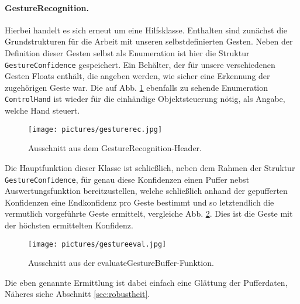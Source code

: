 	\paragraph{GestureRecognition.} Hierbei handelt es sich erneut um eine Hilfsklasse. Enthalten sind zunächst die Grundstrukturen für die Arbeit mit unseren selbstdefinierten Gesten. Neben der Definition dieser Gesten selbst als Enumeration ist hier die Struktur \glqq \texttt{GestureConfidence}\grqq{} gespeichert. Ein Behälter, der für unsere verschiedenen Gesten Floats enthält, die angeben werden, wie sicher eine Erkennung der zugehörigen Geste war. Die auf Abb. \ref{fig:gestrechead} ebenfalls zu sehende Enumeration \texttt{ControlHand} ist wieder für die einhändige Objektsteuerung nötig, als Angabe, welche Hand steuert.\par
	\begin{figure}[h]
	\centering
	\texttt{[image: pictures/gesturerec.jpg]}
	\caption{Ausschnitt aus dem GestureRecognition-Header.}\label{fig:gestrechead}
	\end{figure}	
	Die Hauptfunktion dieser Klasse ist schließlich, neben dem Rahmen der Struktur \texttt{GestureConfidence}, für genau diese Konfidenzen einen Puffer nebst Auswertungsfunktion bereitzustellen, welche schließlich anhand der gepufferten Konfidenzen eine Endkonfidenz pro Geste bestimmt und so letztendlich die vermutlich vorgeführte Geste ermittelt, vergleiche Abb. \ref{fig:evalgestbuf}. Dies ist die Geste mit der höchsten ermittelten Konfidenz.
	\begin{figure}
	\centering
	\texttt{[image: pictures/gestureeval.jpg]}
	\caption{Ausschnitt aus der evaluateGestureBuffer-Funktion.}\label{fig:evalgestbuf}
	\end{figure}
	Die eben genannte \glqq Ermittlung\grqq{} ist dabei einfach eine Glättung der Pufferdaten, Näheres siehe Abschnitt \ref{sec:robustheit}.\par\medskip
